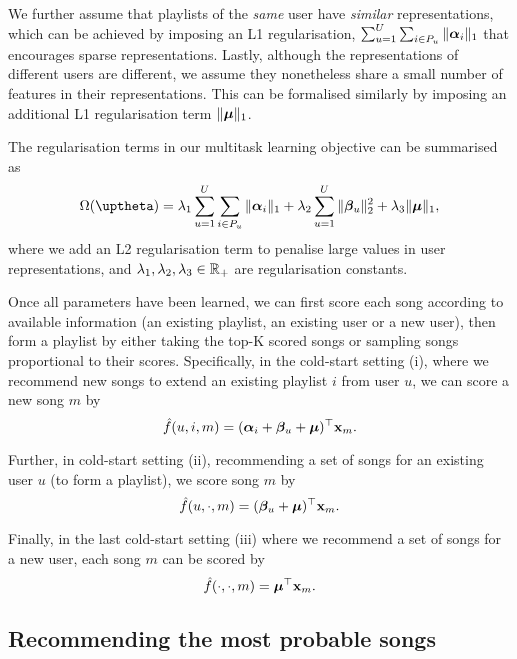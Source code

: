 We further assume that playlists of the \emph{same} user have \emph{similar} representations,
which can be achieved by imposing an L1 regularisation, \ie $\sum_{u=1}^U \sum_{i \in P_u} \| {\bm{\alpha}}_i \|_1$
that encourages sparse representations.
Lastly, although the representations of different users are different,
we assume they nonetheless share a small number of features in their representations.
This can be formalised similarly by imposing an additional L1 regularisation term $\| \bm{\mu} \|_1$.

The regularisation terms in our multitask learning objective can be summarised as
\begin{equation}
\label{eq:reg}
\Omega(\uptheta) = \lambda_1 \sum_{u=1}^U \sum_{i \in P_u} \|\alphabm_i\|_1 + \lambda_2 \sum_{u=1}^U \|\betabm_u\|_2^2 + \lambda_3 \| \bmu \|_1,
\end{equation}
where we add an L2 regularisation term to penalise large values in user representations,
and $\lambda_1, \lambda_2, \lambda_3 \in \mathbb{R}_+$ are regularisation constants.

Once all parameters have been learned, 
we can first score each song according to available information (\eg an existing playlist, an existing user or a new user),
then form a playlist by either taking the top-K scored songs or sampling songs proportional to their scores.
Specifically, in the cold-start setting (i), where we recommend new songs to extend an existing playlist $i$ from user $u$, 
we can score a new song $m$ by
$$
\hat f(u, i, m) = ({\bm{\alpha}}_i + {\bm{\beta}}_u + \bm{\mu})^\top \mathbf{x}_m.
$$

Further, in cold-start setting (ii), \ie recommending a set of songs for an existing user $u$ (to form a playlist), 
we score song $m$ by
$$
\hat f(u, \cdot, m) = ({\bm{\beta}}_u + \bm{\mu})^\top \mathbf{x}_m.
$$

Finally, in the last cold-start setting (iii) where we recommend a set of songs for a new user, each song $m$ can be scored by
$$
\hat f(\cdot, \cdot, m) = \bm{\mu}^\top \mathbf{x}_m.
$$




\subsection{Recommending the most probable songs}
\label{ssec:bploss}

